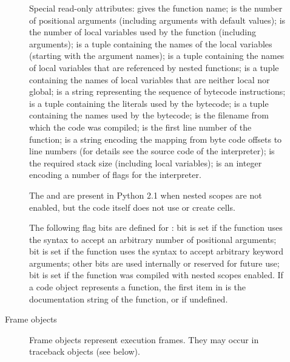 \begin{description}
\begin{description}
Special read-only attributes:  gives the function
name;  is the number of positional arguments
(including arguments with default values);  is the
number of local variables used by the function (including arguments);
 is a tuple containing the names of the local
variables (starting with the argument names);  is
a tuple containing the names of local variables that are referenced by
nested functions;  is a tuple containing the names
of local variables that are neither local nor global; 
is a string representing the sequence of bytecode instructions;
 is a tuple containing the literals used by the
bytecode;  is a tuple containing the names used by
the bytecode;  is the filename from which the code
was compiled;  is the first line number of the
function;  is a string encoding the mapping from
byte code offsets to line numbers (for details see the source code of
the interpreter);  is the required stack size
(including local variables);  is an integer encoding
a number of flags for the interpreter.

The  and  are present in
Python 2.1 when nested scopes are not enabled, but the code itself
does not use or create cells.


The following flag bits are defined for : bit
 is set if the function uses the  syntax
to accept an arbitrary number of positional arguments; bit
 is set if the function uses the  syntax
to accept arbitrary keyword arguments; other bits are used internally
or reserved for future use; bit  is set if the function was
compiled with nested scopes enabled.  If a
code object represents a function, the first item in
 is the documentation string of the function, or
 if undefined.

\item[Frame objects]
Frame objects represent execution frames.  They may occur in traceback
objects (see below).


\end{description}
\end{description}
